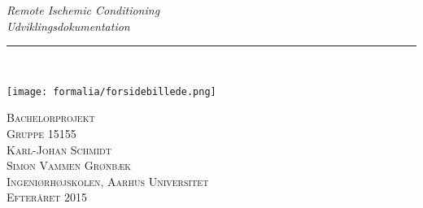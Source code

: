 \thispagestyle{empty}
\begin{flushright}
\vspace{3cm}

\phantom{hul}

\phantom{hul}

\phantom{hul}

\textsl{\Huge Remote Ischemic Conditioning} \\ \vspace{1cm}
\textsl{\Huge Udviklingsdokumentation} \\ \vspace{1cm}

\rule{\textwidth}{3mm} \\ \vspace{1.5cm}
\vspace{1cm}

\texttt{[image: formalia/forsidebillede.png]}

\vspace{2cm} 
\textsc{\Large Bachelorprojekt \\
Gruppe 15155 \\
Karl-Johan Schmidt \\
Simon Vammen Grønbæk \\
Ingeniørhøjskolen, Aarhus Universitet \\
Efteråret 2015 \\}
\end{flushright}
